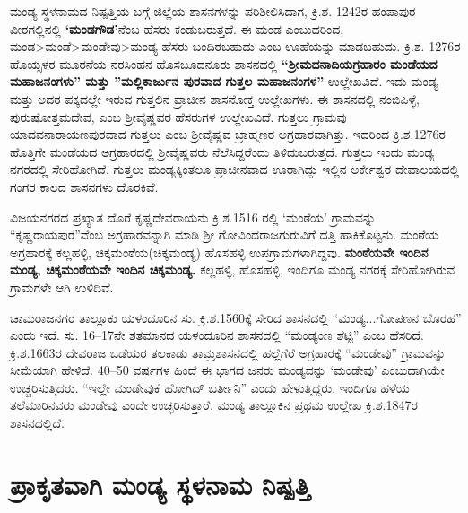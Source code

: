 ಮಂಡ್ಯ ಸ್ಥಳನಾಮದ ನಿಷ್ಪತ್ತಿಯ ಬಗ್ಗೆ ಜಿಲ್ಲೆಯ ಶಾಸನಗಳನ್ನು ಪರಿಶೀಲಿಸಿದಾಗ, ಕ್ರಿ.ಶ. 1242ರ ಹಂಪಾಪುರ ವೀರಗಲ್ಲಿನಲ್ಲಿ \textbf{‘ಮಂಡಗೌಡ’}ನೆಂಬ ಹೆಸರು ಕಂಡುಬರುತ್ತದೆ. ಈ ಮಂಡ ಎಂಬುದರಿಂದ, ಮಂಡ\textgreater ಮಂಡೆ\textgreater ಮಂಡೇವು\textgreater ಮಂಡ್ಯ ಹೆಸರು ಬಂದಿರಬಹುದು ಎಂಬ ಊಹೆಯನ್ನು ಮಾಡಬಹುದು. ಕ್ರಿ.ಶ. 1276ರ ಹೊಯ್ಸಳರ ಮೂರನೆಯ ನರಸಿಂಹನ ಹೊಸಬೂದನೂರು ಶಾಸನದಲ್ಲಿ \textbf{“ಶ‍್ರೀಮದನಾದಿಯಗ್ರಹಾರಂ ಮಂಡೆಯದ ಮಹಾಜನಂಗಳು” ಮತ್ತು ''ಮಲ್ಲಿಕಾರ್ಜುನ ಪುರವಾದ ಗುತ್ತಲ ಮಹಾಜನಂಗಳ”} ಉಲ್ಲೇಖವಿದೆ. ಇದು ಮಂಡ್ಯ ಮತ್ತು ಅದರ ಪಕ್ಕದಲ್ಲೇ ಇರುವ ಗುತ್ತಲಿನ ಪ್ರಾಚೀನ ಶಾಸನೋಕ್ತ ಉಲ್ಲೇಖಗಳು. ಈ ಶಾಸನದಲ್ಲಿ ನಂಬಿಪಿಳ್ಳೆ, ಪುರುಷೋತ್ತಮದೇವ, ಎಂಬ ಶ‍್ರೀವೈಷ್ಣವರ ಹೆಸರುಗಳ ಉಲ್ಲೇಖವಿದೆ. ಗುತ್ತಲು ಗ್ರಾಮವು ಯಾದವನಾರಾಯಣಪುರವಾದ ಗುತ್ತಲು ಎಂಬ ಶ‍್ರೀವೈಷ್ಣವ ಬ್ರಾಹ್ಮಣರ ಅಗ್ರಹಾರವಾಗಿತ್ತು. ಇದರಿಂದ ಕ್ರಿ.ಶ.1276ರ ಹೊತ್ತಿಗೇ ಮಂಡೆಯದ ಅಗ್ರಹಾರದಲ್ಲಿ ಶ‍್ರೀವೈಷ್ಣವರು ನೆಲೆಸಿದ್ದರೆಂದು ತಿಳಿದುಬರುತ್ತದೆ. ಗುತ್ತಲು ಇಂದು ಮಂಡ್ಯ ನಗರದಲ್ಲಿ ಸೇರಿಹೋಗಿದೆ. ಗುತ್ತಲು ಮಂಡ್ಯಕ್ಕಿಂತಲೂ ಪ್ರಾಚೀನವಾದ ಊರಾಗಿದ್ದು ಇಲ್ಲಿನ ಅರ್ಕೇಶ್ವರ ದೇವಾಲಯದಲ್ಲಿ ಗಂಗರ ಕಾಲದ ಶಾಸನಗಳು ದೊರಕಿವೆ.

ವಿಜಯನಗರದ ಪ್ರಖ್ಯಾತ ದೊರೆ ಕೃಷ್ಣದೇವರಾಯನು ಕ್ರಿ.ಶ.1516 ರಲ್ಲಿ ‘ಮಂಠೆಯ’ ಗ್ರಾಮವನ್ನು “ಕೃಷ್ಣರಾಯಪುರ”ವೆಂಬ ಅಗ್ರಹಾರವನ್ನಾಗಿ ಮಾಡಿ ಶ‍್ರೀ ಗೋವಿಂದರಾಜಗುರುವಿಗೆ ದತ್ತಿ ಹಾಕಿಕೊಟ್ಟನು. ಮಂಠೆಯ ಅಗ್ರಹಾರಕ್ಕೆ ಕಲ್ಲಹಳ್ಳಿ, ಚಿಕ್ಕಮಂಠೆಯ(ಚಿಕ್ಕಮಂಡ್ಯ) ಹೊಸಹಳ್ಳಿ ಉಪಗ್ರಾಮಗಳಾಗಿದ್ದವು. \textbf{ಮಂಠೆಯವೇ ಇಂದಿನ ಮಂಡ್ಯ, ಚಿಕ್ಕಮಂಠೆಯವೇ ಇಂದಿನ ಚಿಕ್ಕಮಂಡ್ಯ.} ಕಲ್ಲಹಳ್ಳಿ, ಹೊಸಹಳ್ಳಿ, ಇಂದಿಗೂ ಮಂಡ್ಯ ನಗರಕ್ಕೆ ಸೇರಿಹೋಗಿರುವ ಗ್ರಾಮಗಳೇ ಆಗಿ ಉಳಿದಿವೆ.

ಚಾಮರಾಜನಗರ ತಾಲ್ಲೂಕು ಯಳಂದೂರಿನ ಸು. ಕ್ರಿ.ಶ.1560ಕ್ಕೆ ಸೇರಿದ ಶಾಸನದಲ್ಲಿ “ಮಂಡ್ಯ...ಗೋಪಣನ ಬೊರಹ” ಎಂದು ಇದೆ. ಸು. 16–17ನೇ ಶತಮಾನದ ಯಳಂದೂರಿನ ಶಾಸನದಲ್ಲಿ “ಮಂಡ್ಯಂಣ ಶೆಟ್ಟಿ” ಎಂಬ ಹೆಸರಿದೆ. ಕ್ರಿ.ಶ.1663ರ ದೇವರಾಜ ಒಡೆಯರ ತಲಕಾಡು ತಾಮ್ರಶಾಸನದಲ್ಲಿ ಹಲ್ಲೆಗೆರೆ ಅಗ್ರಹಾರಕ್ಕೆ “ಮಂಡೇವು” ಗ್ರಾಮವನ್ನು ಸೀಮೆಯಾಗಿ ಹೇಳಿದೆ. 40–50 ವರ್ಷಗಳ ಹಿಂದೆ ಈ ಭಾಗದ ಜನರು ಮಂಡ್ಯವನ್ನು ‘ಮಂಡೇವು’ ಎಂಬುದಾಗಿಯೇ ಉಚ್ಚರಿಸುತ್ತಿದರು. “ಇಲ್ಲೇ ಮಂಡೇವುಕೆ ಹೋಗಿದ್​ ಬರ್ತೀನಿ” ಎಂದು ಹೇಳುತ್ತಿದ್ದರು. ಇಂದಿಗೂ ಹಳೆಯ ತಲೆಮಾರಿನವರು ಮಂಡೇವು ಎಂದೇ ಉಚ್ಛರಿಸುತ್ತಾರೆ. ಮಂಡ್ಯ ತಾಲ್ಲೂಕಿನ ಪ್ರಥಮ ಉಲ್ಲೇಖ ಕ್ರಿ.ಶ.1847ರ ಶಾಸನದಲ್ಲಿದೆ.


\section{ಪ್ರಾಕೃತವಾಗಿ ಮಂಡ್ಯ ಸ್ಥಳನಾಮ ನಿಷ್ಪತ್ತಿ}

